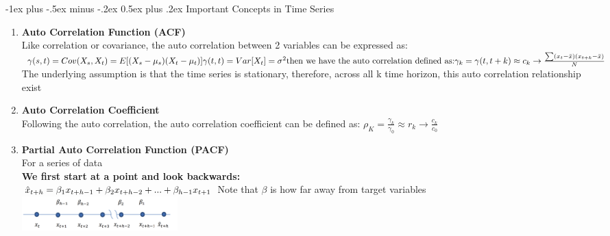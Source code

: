 \documentclass[10pt,landscape]{article}
\makeatletter
\renewcommand{\section}{\@startsection{section}{1}{0mm}%
                                {-1ex plus -.5ex minus -.2ex}%
                                {0.5ex plus .2ex}%
                                {\normalfont\large\bfseries}}
\makeatother
\begin{document}
\newpage
\begin{multicols}{3}
\setlength{\premulticols}{1pt}
\setlength{\postmulticols}{1pt}
\setlength{\multicolsep}{1pt}
\setlength{\columnsep}{2pt}



\section{Important Concepts in Time Series}
\begin{enumerate}
  \item \textbf{Auto Correlation Function (ACF)}\\
  		Like correlation or covariance, the auto correlation between 2 variables can be expressed as:\\
  		$
  		\gamma(s,t) = Cov(X_s, X_t) = E[(X_s - \mu_s)(X_t-\mu_t)]\\
  		\gamma(t,t) = Var[X_t] = \sigma^2\\
  		\text{then we have the auto correlation defined as:}\\
  		\gamma_k = \gamma(t, t+k) \approx c_k \rightarrow \frac{\sum(x_t - \bar x)(x_{t+k}-\bar x)}{N} \\
  		\text{}
  		$The underlying assumption is that the time series is stationary, therefore, across all k time horizon, this auto correlation relationship exist
  \item \textbf{Auto Correlation Coefficient}\\
  		Following the auto correlation, the auto correlation coefficient can be defined as:
  		$
  		\rho_K = \frac{\gamma_k}{\gamma_0} \approx r_k \rightarrow \frac{c_k}{c_0}
  		$
  		
  \item \textbf{Partial Auto Correlation Function (PACF)}\\
  		For a series of data\\
  		\textbf{We first start at a point and look backwards:}\\
  		$
  		\hat x_{t+h} = \beta_1 x_{t+h-1} + \beta_2 x_{t+h-2} + ... + \beta_{h-1} x_{t+1}\\
  		$
  		Note that  $\beta$  is how far away from target variables\\
  		\includegraphics[width=60mm,scale=1]{images/PACF-1.png}
  		

\end{enumerate}
\end{multicols}
\end{document}

